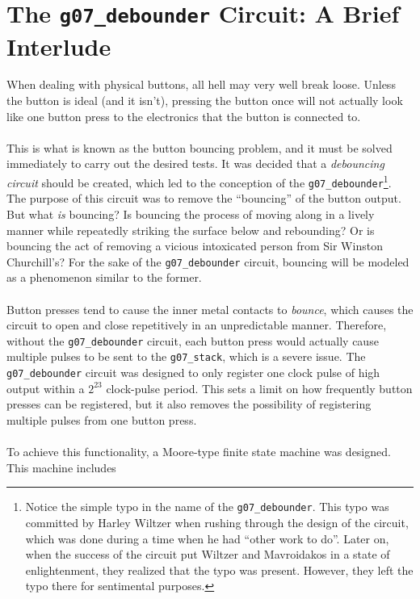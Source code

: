 \documentclass[12pt]{report}
\begin{document}
\section*{The \texttt{g07\_debounder} Circuit: A Brief Interlude}
When dealing with physical buttons, all hell may very well break loose. Unless the button is ideal
(and it isn't), pressing the button once will not actually look like one button press to the
electronics that the button is connected to.\\\\
This is what is known as the button bouncing problem, and it must be solved immediately to carry out
the desired tests. It was decided that a \textit{debouncing circuit} should be created, which led to
the conception of the \texttt{g07\_debounder}\footnote{Notice the simple typo in the name of the
	\texttt{g07\_debounder}. This typo was committed by Harley Wiltzer when rushing through the
	design of the circuit, which was done during a time when he had ``other work to do''. Later on,
	when the success of the circuit put Wiltzer and Mavroidakos in a state of enlightenment, they
realized that the typo was present. However, they left the typo there for sentimental purposes.}.
The purpose of this circuit was to remove the
``bouncing'' of the button output. But what \textit{is} bouncing? Is bouncing the process of moving
along in a lively manner while repeatedly striking the surface below and rebounding? Or is bouncing
the act of removing a vicious intoxicated person from Sir Winston Churchill's? For the sake of the
\texttt{g07\_debounder} circuit, bouncing will be modeled as a phenomenon similar to the former.\\\\
Button presses tend to cause the inner metal contacts to \textit{bounce}, which causes the circuit
to open and close repetitively in an unpredictable manner. Therefore, without the
\texttt{g07\_debounder} circuit, each button press would actually cause multiple pulses to be sent
to the \texttt{g07\_stack}, which is a severe issue. The \texttt{g07\_debounder} circuit was
designed to only register one clock pulse of high output within a $2^{23}$ clock-pulse period. This
sets a limit on how frequently button presses can be registered, but it also removes the possibility
of registering multiple pulses from one button press.\\\\
To achieve this functionality, a Moore-type finite state machine was designed. This machine includes
\end{document}
